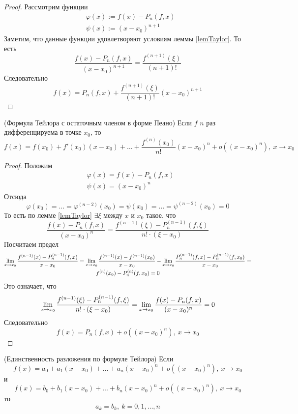 \begin{proof}
	Рассмотрим функции
	\begin{align*}
		&\varphi(x) := f(x) - P_n(f, x)
		\\
		&\psi(x) := (x - x_0)^{n + 1}
	\end{align*}
	Заметим, что данные функции удовлетворяют условиям леммы \ref{lemTaylor}. То есть
	\[
		\frac{f(x) - P_n(f, x)}{(x - x_0)^{n + 1}} = \frac{f^{(n + 1)}(\xi)}{(n + 1)!}
	\]
	Следовательно
	\[
		f(x) = P_n(f, x) + \frac{f^{(n + 1)}(\xi)}{(n + 1)!}(x - x_0)^{n + 1}
	\]
\end{proof}

\begin{theorem} (Формула Тейлора с остаточным членом в форме Пеано)
	Если $f$ $n$ раз дифференцируема в точке $x_0$, то
	\[
		f(x) = f(x_0) + f'(x_0)(x - x_0) + \ldots + \frac{f^{(n)}(x_0)}{n!}(x - x_0)^n + o\left((x - x_0)^n\right),\ x \to x_0
	\]
\end{theorem}

\begin{proof}
	Положим
	\begin{align*}
		&\varphi(x) = f(x) - P_n(f, x)
		\\
		&\psi(x) = (x - x_0)^n
	\end{align*}
	Отсюда
	\[
		\varphi(x_0) = \ldots = \varphi^{(n - 2)}(x_0) = \psi(x_0) = \ldots = \psi^{(n - 2)}(x_0) = 0
	\]
	То есть по лемме \ref{lemTaylor} $\exists \xi$ между $x$ и $x_0$ такое, что
	\[
		\frac{f(x) - P_n(f, x)}{(x - x_0)^n} = \frac{f^{(n - 1)}(\xi) - P_n^{(n - 1)}(f, \xi)}{n! \cdot (\xi - x_0)}
	\]
	Посчитаем предел
	\begin{multline*}
		\lim\limits_{x \to x_0} \frac{f^{(n - 1)}(x) - P_n^{(n - 1)}(f, x)}{x - x_0} = \lim\limits_{x \to x_0} \frac{f^{(n - 1)}(x) - f^{(n - 1)}(x_0)}{x - x_0} - \lim\limits_{x \to x_0} \frac{P_n^{(n - 1)}(f, x) - P_n^{(n - 1)}(f, x_0)}{x - x_0} = \\
		f^{(n)}(x_0) - P_n^{(n)}(f, x_0) = 0
	\end{multline*}
	Это означает, что
	\[
		\lim\limits_{x \to x_0} \frac{f^{(n - 1)}(\xi) - P_n^{(n - 1)}(f, \xi)}{n! \cdot (\xi - x_0)} = \lim\limits_{x \to x_0} \frac{f(x) - P_n(f, x)}{(x - x_0)^n} = 0
	\]
	Следовательно
	\[
		f(x) = P_n(f, x) + o((x - x_0)^n),\ x \to x_0
	\]
\end{proof}

\begin{theorem} (Единственность разложения по формуле Тейлора)
	Если 
	\[
		f(x) = a_0 + a_1(x - x_0) + \ldots + a_n(x - x_0)^n + o\left((x - x_0)^n\right),\ x \to x_0
    \]
    и 
    \[
    	f(x) = b_0 + b_1(x - x_0) + \ldots + b_n(x - x_0)^n + o\left((x - x_0)^n\right),\ x \to x_0
    \] то
	\[
		a_k = b_k,\ k = 0, 1, \ldots, n
	\]
\end{theorem}

